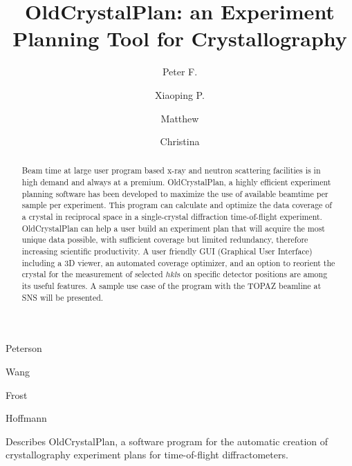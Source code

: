 \documentclass[final]{iucr}              %
\begin{document}


\title{OldCrystalPlan: an Experiment Planning Tool for Crystallography}



\author[]{Peter F.}{Peterson}
\author[]{Xiaoping P.}{Wang}
\author[]{Matthew}{Frost}
\author[]{Christina}{Hoffmann}







\maketitle                        %

\begin{synopsis}
Describes OldCrystalPlan, a software program for the automatic creation of 
crystallography experiment plans for time-of-flight diffractometers.
\end{synopsis}

\begin{abstract}
Beam time at large user program based x-ray and neutron scattering facilities is
in high demand and always at a premium. OldCrystalPlan, a highly efficient
experiment planning software has been developed to maximize the use of available
beamtime per sample per experiment. 
This program can calculate and optimize the data coverage of a crystal in
reciprocal space in a single-crystal diffraction time-of-flight experiment.
OldCrystalPlan can help a user build an experiment plan that will acquire the most
unique data possible, with sufficient coverage but limited redundancy, therefore
increasing scientific productivity. 
A user friendly GUI (Graphical User Interface) including a 3D viewer, an
automated coverage optimizer, and an option to reorient the crystal for the measurement 
of selected $hkl$s on specific detector positions 
are among its useful features. 
A sample use case of the program with the TOPAZ beamline at SNS will be
presented. 
\end{abstract}
\end{document}
